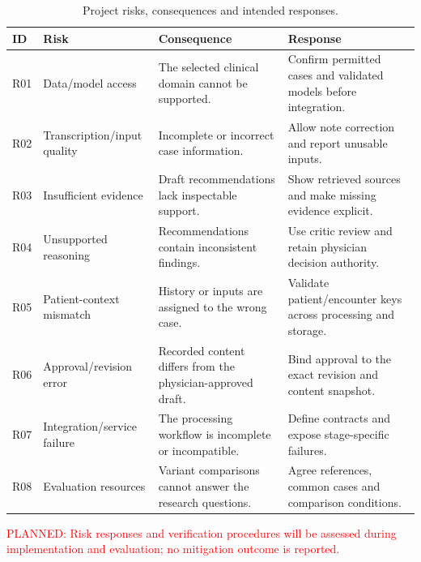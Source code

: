 \begin{table}[htbp]
\centering
\small
\caption{Project risks, consequences and intended responses.}
\label{tab:kashaf:risks}
\begin{tabular}{|p{}|p{}|p{}|p{}|}
\hline
ID & Risk & Consequence & Response \\ \hline
R01 & Data/model access & The selected clinical domain cannot be supported. & Confirm permitted cases and validated models before integration. \\ \hline
R02 & Transcription/input quality & Incomplete or incorrect case information. & Allow note correction and report unusable inputs. \\ \hline
R03 & Insufficient evidence & Draft recommendations lack inspectable support. & Show retrieved sources and make missing evidence explicit. \\ \hline
R04 & Unsupported reasoning & Recommendations contain inconsistent findings. & Use critic review and retain physician decision authority. \\ \hline
R05 & Patient-context mismatch & History or inputs are assigned to the wrong case. & Validate patient/encounter keys across processing and storage. \\ \hline
R06 & Approval/revision error & Recorded content differs from the physician-approved draft. & Bind approval to the exact revision and content snapshot. \\ \hline
R07 & Integration/service failure & The processing workflow is incomplete or incompatible. & Define contracts and expose stage-specific failures. \\ \hline
R08 & Evaluation resources & Variant comparisons cannot answer the research questions. & Agree references, common cases and comparison conditions. \\ \hline
\end{tabular}
\end{table}

\textcolor{red}{PLANNED: Risk responses and verification procedures will be assessed during implementation and evaluation; no mitigation outcome is reported.}

\clearpage
\endgroup
